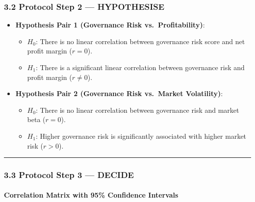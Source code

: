\documentclass[
]{article}
\providecommand{\tightlist}{%
  \setlength{\itemsep}{0pt}\setlength{\parskip}{0pt}}
\begin{document}
\subsubsection{3.2 Protocol Step 2 ---
HYPOTHESISE}\label{protocol-step-2-hypothesise-1}

\begin{itemize}
\tightlist
\item
  \textbf{Hypothesis Pair 1 (Governance Risk vs.~Profitability)}:

  \begin{itemize}
  \tightlist
  \item
    \(H_0\): There is no linear correlation between governance risk
    score and net profit margin (\(r = 0\)).
  \item
    \(H_1\): There is a significant linear correlation between
    governance risk and profit margin (\(r \ne 0\)).
  \end{itemize}
\item
  \textbf{Hypothesis Pair 2 (Governance Risk vs.~Market Volatility)}:

  \begin{itemize}
  \tightlist
  \item
    \(H_0\): There is no linear correlation between governance risk and
    market beta (\(r = 0\)).
  \item
    \(H_1\): Higher governance risk is significantly associated with
    higher market risk (\(r > 0\)).
  \end{itemize}
\end{itemize}

\begin{center}\rule{0.5\linewidth}{0.5pt}\end{center}

\subsubsection{3.3 Protocol Step 3 ---
DECIDE}\label{protocol-step-3-decide-1}

\paragraph{Correlation Matrix with 95\% Confidence
Intervals}\label{correlation-matrix-with-95-confidence-intervals}
\end{document}

